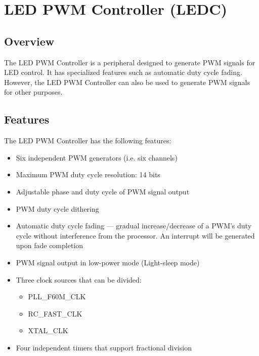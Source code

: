 \documentclass[main\_\_EN.tex]{subfiles}
\begin{document}

\ifglobal
\else
    {\let\clearpage\relax \listoftodos}
    {\let\clearpage\relax \listofdonetodos}
    \tableofcontents
\fi



\hypertarget{ledpwm}{}
\chapter{LED PWM Controller (LEDC)}
\label{mod:ledpwm}


\section{Overview}


The LED PWM Controller is a peripheral designed to generate PWM signals for LED control. It has specialized features such as automatic duty cycle fading. However, the LED PWM Controller can also be used to generate PWM signals for other purposes.

\section{Features}
The LED PWM Controller has the following features:

\begin{itemize}
    \item Six independent PWM generators (i.e. six channels)
    \item Maximum PWM duty cycle resolution: 14 bits
    \item Adjustable phase and duty cycle of PWM signal output
    \item PWM duty cycle dithering
    \item Automatic duty cycle fading — gradual increase/decrease of a PWM's duty cycle without interference from the processor. An interrupt will be generated upon fade completion
    \item PWM signal output in low-power mode (Light-sleep mode)
    \item Three clock sources that can be divided:
        \begin{itemize}
            \item PLL\_F60M\_CLK
            \item RC\_FAST\_CLK
            \item XTAL\_CLK
        \end{itemize}
    \item Four independent timers that support fractional division
\end{itemize}
\end{document}
